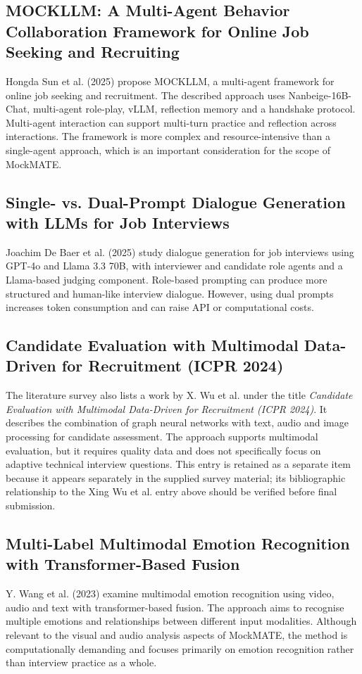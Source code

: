 \documentclass[12pt,a4paper,oneside]{report}
\begin{document}
\subsection{MOCKLLM: A Multi-Agent Behavior Collaboration Framework for Online Job Seeking and Recruiting}
Hongda Sun et al. (2025) propose MOCKLLM, a multi-agent framework for online job seeking and recruitment. The described approach uses Nanbeige-16B-Chat, multi-agent role-play, vLLM, reflection memory and a handshake protocol. Multi-agent interaction can support multi-turn practice and reflection across interactions. The framework is more complex and resource-intensive than a single-agent approach, which is an important consideration for the scope of MockMATE.

\subsection{Single- vs. Dual-Prompt Dialogue Generation with LLMs for Job Interviews}
Joachim De Baer et al. (2025) study dialogue generation for job interviews using GPT-4o and Llama 3.3 70B, with interviewer and candidate role agents and a Llama-based judging component. Role-based prompting can produce more structured and human-like interview dialogue. However, using dual prompts increases token consumption and can raise API or computational costs.

\subsection{Candidate Evaluation with Multimodal Data-Driven for Recruitment (ICPR 2024)}
The literature survey also lists a work by X. Wu et al. under the title \emph{Candidate Evaluation with Multimodal Data-Driven for Recruitment (ICPR 2024)}. It describes the combination of graph neural networks with text, audio and image processing for candidate assessment. The approach supports multimodal evaluation, but it requires quality data and does not specifically focus on adaptive technical interview questions. This entry is retained as a separate item because it appears separately in the supplied survey material; its bibliographic relationship to the Xing Wu et al. entry above should be verified before final submission.

\subsection{Multi-Label Multimodal Emotion Recognition with Transformer-Based Fusion}
Y. Wang et al. (2023) examine multimodal emotion recognition using video, audio and text with transformer-based fusion. The approach aims to recognise multiple emotions and relationships between different input modalities. Although relevant to the visual and audio analysis aspects of MockMATE, the method is computationally demanding and focuses primarily on emotion recognition rather than interview practice as a whole.
\end{document}
